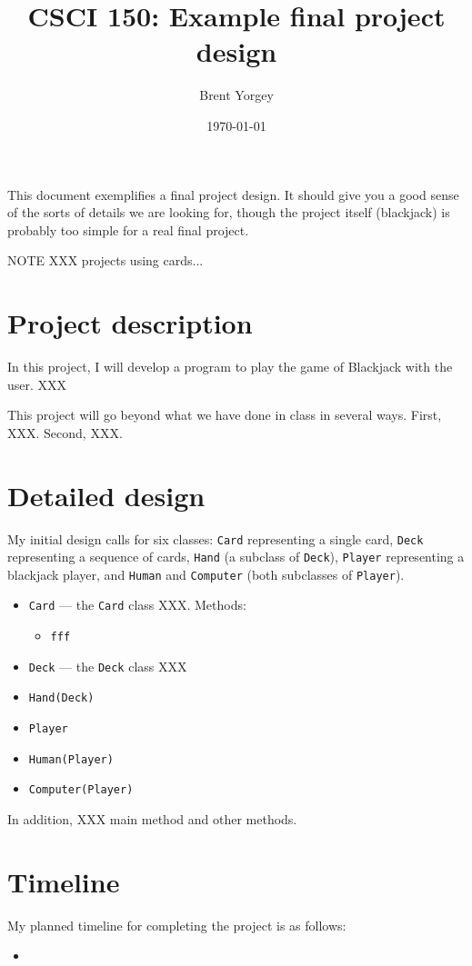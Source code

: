 \documentclass{tufte-handout}
\begin{document}
\title{CSCI 150: Example final project design}
\author{Brent Yorgey}
\date{\today}

\maketitle

This document exemplifies a final project design.  It should give you
a good sense of the sorts of details we are looking for, though the
project itself (blackjack) is probably too simple for a real final
project.

NOTE XXX projects using cards...

\section{Project description}

In this project, I will develop a program to play the game of
Blackjack with the user. XXX

This project will go beyond what we have done in class in several
ways.  First, XXX.   Second, XXX.

\section{Detailed design}

My initial design calls for six classes: \verb|Card| representing a
single card, \verb|Deck| representing a sequence of cards, \verb|Hand|
(a subclass of \verb|Deck|), \verb|Player| representing a blackjack
player, and \verb|Human| and \verb|Computer| (both subclasses of
\verb|Player|).

\begin{itemize}
\item \verb|Card| --- the \verb|Card| class XXX.  Methods:
  \begin{itemize}
  \item \verb|fff|
  \end{itemize}
\item \verb|Deck| --- the \verb|Deck| class XXX
\item \verb|Hand(Deck)|
\item \verb|Player|
\item \verb|Human(Player)|
\item \verb|Computer(Player)|
\end{itemize}

In addition, XXX main method and other methods.

\section{Timeline}

My planned timeline for completing the project is as follows:

\begin{itemize}
\item 
\end{itemize}
\end{document}
